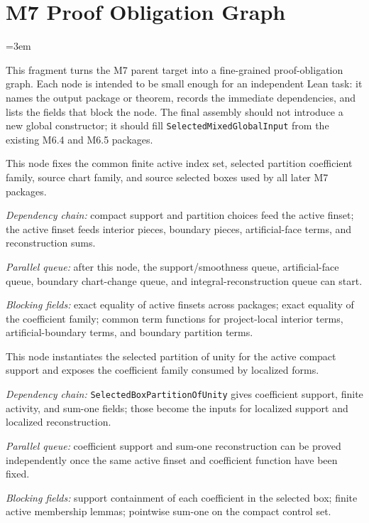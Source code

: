 \section{M7 Proof Obligation Graph}
\label{sec:m7_proof_obligation_graph}
\begingroup
\sloppy
\emergencystretch=3em

This fragment turns the M7 parent target into a fine-grained proof-obligation
graph.  Each node is intended to be small enough for an independent Lean task:
it names the output package or theorem, records the immediate dependencies, and
lists the fields that block the node.  The final assembly should not introduce a
new global constructor; it should fill \texttt{SelectedMixedGlobalInput} from
the existing M6.4 and M6.5 packages.

\begin{definition}
  \label{obl:m7_shared_index_spine}
  This node fixes the common finite active index set, selected partition
  coefficient family, source chart family, and source selected boxes used by all
  later M7 packages.

  \emph{Dependency chain:}
  compact support and partition choices feed the active finset; the active
  finset feeds interior pieces, boundary pieces, artificial-face terms, and
  reconstruction sums.

  \emph{Parallel queue:}
  after this node, the support/smoothness queue, artificial-face queue,
  boundary chart-change queue, and integral-reconstruction queue can start.

  \emph{Blocking fields:}
  exact equality of active finsets across packages; exact equality of the
  coefficient family; common term functions for project-local interior terms,
  artificial-boundary terms, and boundary partition terms.
\end{definition}

\begin{definition}
  \label{obl:m7_selected_partition_witness}
  This node instantiates the selected partition of unity for the active compact
  support and exposes the coefficient family consumed by localized forms.

  \emph{Dependency chain:}
  \texttt{SelectedBoxPartitionOfUnity} gives coefficient support, finite
  activity, and sum-one fields; those become the inputs for localized support
  and localized reconstruction.

  \emph{Parallel queue:}
  coefficient support and sum-one reconstruction can be proved independently
  once the same active finset and coefficient function have been fixed.

  \emph{Blocking fields:}
  support containment of each coefficient in the selected box; finite active
  membership lemmas; pointwise sum-one on the compact control set.
\end{definition}

